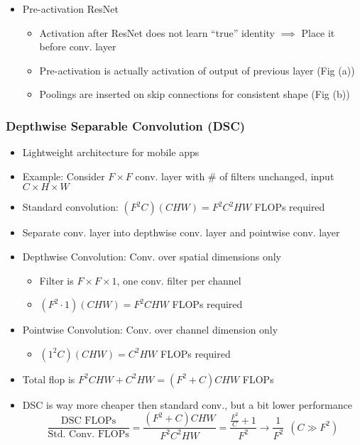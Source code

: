 \begin{itemize}
    \item Pre-activation ResNet
    \begin{itemize}
        \item Activation after ResNet does not learn ``true'' identity $\implies$ Place it before conv. layer
        \item Pre-activation is actually activation of output of previous layer (Fig (a))
        \item Poolings are inserted on skip connections for consistent shape (Fig (b))
    \end{itemize}
    \begin{figures}
    \end{figures}
\end{itemize}

\subsubsection*{Depthwise Separable Convolution (DSC)}
\begin{itemize}
    \item Lightweight architecture for mobile apps
    \item Example: Consider $F\times F$ conv. layer with \# of filters unchanged, input $C\times H\times W$
    \item Standard convolution: $(F^2C)(CHW)=F^2C^2HW$ FLOPs required
    \item Separate conv. layer into depthwise conv. layer and pointwise conv. layer
    \item Depthwise Convolution: Conv. over spatial dimensions only
    \begin{itemize}
        \item Filter is $F\times F\times 1$, one conv. filter per channel
        \item $(F^2\cdot1)(CHW)=F^2CHW$ FLOPs required
    \end{itemize}
    \item Pointwise Convolution: Conv. over channel dimension only
    \begin{itemize}
        \item $(1^2C)(CHW)=C^2HW$ FLOPs required
    \end{itemize}
    \item Total flop is $F^2CHW+C^2HW=(F^2+C)CHW$ FLOPs
    \item DSC is way more cheaper then standard conv., but a bit lower performance
    \begin{equation}
        \frac{\text{DSC~FLOPs}}{\text{Std.~Conv.~FLOPs}}=\frac{(F^2+C)CHW}{F^2C^2HW}=\frac{\frac{F^2}{C}+1}{F^2}\to\frac{1}{F^2}~~(C\gg F^2)
    \end{equation}
\end{itemize}
\begin{figures}
\end{figures}
